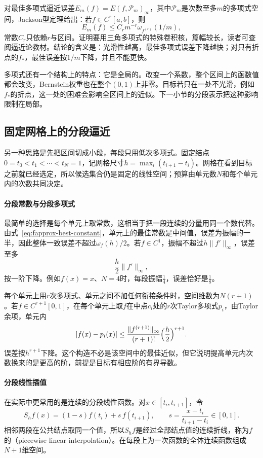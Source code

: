 对最佳多项式逼近误差$E_m(f)=E(f,\mathcal P_m)_\infty$，其中$\mathcal P_m$是次数至多$m$的多项式空间，Jackson型定理给出：若$f\in C^r[a,b]$，则
\begin{equation}
 E_m(f)\leq C_rm^{-r}\omega_{f^{(r)}}(1/m),
 \label{eq:fapprox-jackson}
\end{equation}
常数$C_r$只依赖$r$与区间。证明要用三角多项式的特殊卷积核，篇幅较长，读者可查阅逼近论教材。结论的含义是：光滑性越高，最佳多项式误差下降越快；对只有折点的$f_*$，最佳误差按$1/m$下降，并且不能更快。

多项式还有一个结构上的特点：它是全局的。改变一个系数，整个区间上的函数值都会改变，Bernstein权重也在整个$(0,1)$上非零。目标若只在一处不光滑，例如$f_*$的折点，这一处的困难会影响全区间上的近似。下一小节的分段表示把这种影响限制在局部。

\subsection{固定网格上的分段逼近}
\label{sec:fapprox-fixed-grid}

另一种思路是先把区间切成小段，每段只用低次多项式。固定结点$0=t_0<t_1<\cdots<t_N=1$，记网格尺寸$h=\max_i(t_{i+1}-t_i)$。网格在看到目标之前就已经选定，所以候选集合仍是固定的线性空间；预算由单元数$N$和每个单元内的次数共同决定。

\paragraph{分段常数与分段多项式}
最简单的选择是每个单元上取常数，这相当于把一段连续的分量用同一个数代替。由式~\eqref{eq:fapprox-best-constant}，单元上的最佳常数是中间值，误差为振幅的一半，因此整体一致误差不超过$\omega_f(h)/2$。若$f\in C^1$，振幅不超过$h\lVert f'\rVert_\infty$，误差至多
\[
 \frac h2\lVert f'\rVert_\infty ,
\]
按一阶下降。例如$f(x)=x$、$N=4$时，每段振幅$\frac14$，误差恰好是$\frac18$。

每个单元上用$r$次多项式、单元之间不加任何衔接条件时，空间维数为$N(r+1)$。若$f\in C^{r+1}[0,1]$，在每个单元上取$f$在中点$c_i$处的$r$次Taylor多项式$p_i$，由Taylor余项，单元内
\[
 \lvert f(x)-p_i(x)\rvert\leq\frac{\lVert f^{(r+1)}\rVert_\infty}{(r+1)!}\Bigl(\frac h2\Bigr)^{r+1}.
\]
误差按$h^{r+1}$下降。这个构造不必是该空间中的最佳近似，但它说明提高单元内次数换来的是更高的阶，前提是目标有相应阶的有界导数。

\paragraph{分段线性插值}
在实际中更常用的是连续的分段线性函数。对$x\in[t_i,t_{i+1}]$，令
\begin{equation}
 S_hf(x)=(1-s)f(t_i)+s\,f(t_{i+1}),\qquad s=\frac{x-t_i}{t_{i+1}-t_i}\in[0,1].
 \label{eq:fapprox-linear-interpolant}
\end{equation}
相邻两段在公共结点取同一个值，所以$S_hf$是经过全部结点值的连续折线，称为$f$的（piecewise linear interpolation）。在每段上为一次函数的全体连续函数组成$N+1$维空间。

